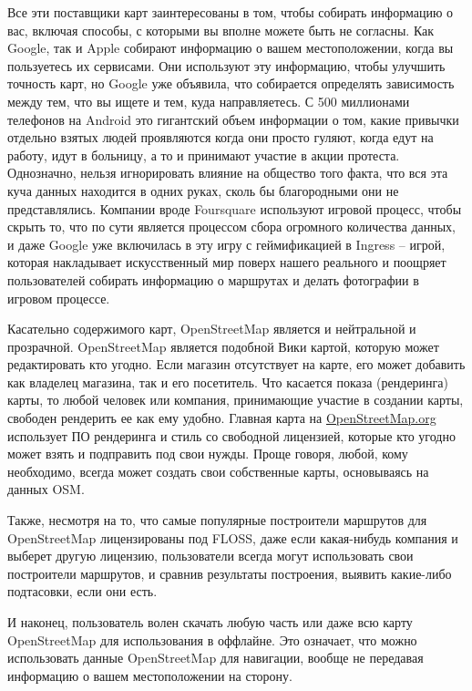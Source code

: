 Все эти поставщики карт заинтересованы в том, чтобы собирать информацию о вас, 
включая способы, с которыми вы вполне можете быть не согласны. Как Google, так 
и Apple собирают информацию о вашем местоположении, когда вы пользуетесь их 
сервисами. Они используют эту информацию, чтобы улучшить точность карт, но 
Google уже объявила, что собирается определять зависимость между тем, что вы 
ищете и тем, куда направляетесь. С 500 миллионами телефонов на Android это 
гигантский объем информации о том, какие привычки отдельно взятых людей 
проявляются когда они просто гуляют, когда едут на работу, идут в больницу, а 
то и принимают участие в акции протеста. Однозначно, нельзя игнорировать 
влияние на общество того факта, что вся эта куча данных находится в одних 
руках, сколь бы благородными они не представлялись. Компании вроде 
Foursquare\cite{four4} используют игровой процесс, чтобы скрыть то, что по 
сути является процессом сбора огромного количества данных, и даже Google уже 
включилась в эту игру с геймификацией в Ingress\cite{ingress} -- игрой, 
которая накладывает искусственный мир поверх нашего реального и поощряет 
пользователей собирать информацию о маршрутах и делать фотографии в
игровом процессе.

Касательно содержимого карт, OpenStreetMap является и нейтральной и 
прозрачной. OpenStreetMap является подобной Вики картой, которую может 
редактировать кто угодно. Если магазин отсутствует на карте, его может 
добавить как владелец магазина, так и его посетитель. Что касается показа 
(рендеринга) карты, то любой человек или компания, принимающие участие в 
создании карты, свободен рендерить ее как ему удобно. Главная карта на 
\url{OpenStreetMap.org} использует ПО рендеринга и стиль со свободной 
лицензией, которые кто угодно может взять и подправить под свои нужды. 
Проще говоря, любой, кому необходимо, всегда может создать свои собственные 
карты, основываясь на данных OSM.

Также, несмотря на то, что самые популярные построители маршрутов для 
OpenStreetMap лицензированы под FLOSS\cite{floss}, даже если какая-нибудь 
компания и выберет другую лицензию, пользователи всегда могут использовать 
свои построители маршрутов, и сравнив результаты построения, выявить 
какие-либо подтасовки, если они есть.

И наконец, пользователь волен скачать любую часть или даже всю карту 
OpenStreetMap для использования в оффлайне. Это означает, что можно 
использовать данные OpenStreetMap для навигации, вообще не передавая 
информацию о вашем местоположении на сторону.\cite{habrahabr01}

